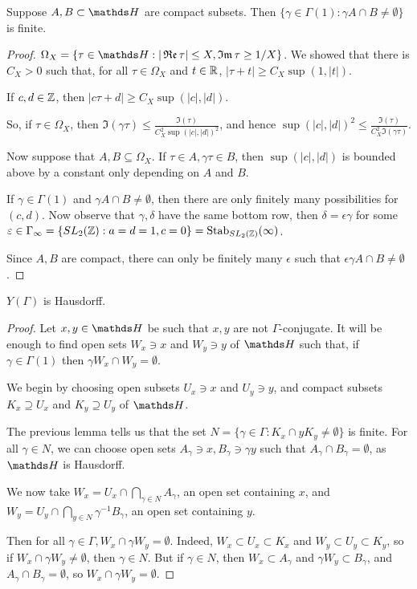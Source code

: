 \documentclass[10pt,a4paper]{article}
\begin{document}
\begin{lemma}
  Suppose $A, B \subset \H$ are compact subsets. Then $\{\gamma \in \Gamma(1): \gamma A \cap B \neq \emptyset\}$ is finite.
\end{lemma}
\begin{proof}
  $\Omega_X = \{\tau \in \H: |\Re \tau| \leq X, \Im \tau \geq 1/X\}$. We showed that there is $C_X >0$ such that, for all $\tau \in \Omega_X$ and $t \in \mathbb{R}$, $|\tau+t| \geq C_X\sup(1, |t|)$.

  If $c,d \in \mathbb{Z}$, then $|c\tau +d| \geq C_X \sup(|c|, |d|)$.

  So, if $\tau \in \Omega_X$, then $\Im(\gamma \tau) \leq \frac{\Im(\tau)}{C_X^2 \sup(|c|,|d|)^2}$, and hence $\sup(|c|,|d|)^2 \leq \frac{\Im(\tau)}{C_X^2 \Im(\gamma \tau)}$.

  Now suppose that $A, B \subseteq \Omega_X$. If $\tau \in A, \gamma \tau \in B$, then $\sup(|c|, |d|)$ is bounded above by a constant only depending on $A$ and $B$.

  If $\gamma \in \Gamma(1)$ and $\gamma A \cap B \neq \emptyset$, then there are only finitely many possibilities for $(c,d)$. Now observe that $\gamma, \delta$ have the same bottom row, then $\delta = \epsilon \gamma$ for some $\varepsilon \in \Gamma_\infty = \{SL_2(\mathbb{Z}): a=d=1, c=0\} = \operatorname{Stab}_{SL_2(\mathbb{Z})}(\infty)$.

  Since $A,B$ are compact, there can only be finitely many $\epsilon$ such that $\epsilon \gamma A \cap B \neq \emptyset$.
\end{proof}
\begin{proposition}
  $Y(\Gamma)$ is Hausdorff.
\end{proposition}
\begin{proof}
  Let $x, y \in \H$ be such that $x, y$ are not $\Gamma$-conjugate. It will be enough to find open sets $W_x \ni x$ and $W_y \ni y$ of $\H$ such that, if $\gamma \in \Gamma(1)$ then $\gamma W_x \cap W_y = \emptyset$.

  We begin by choosing open subsets $U_x \ni x$ and $U_y \ni y$, and compact subsets $K_x \supseteq U_x$ and $K_y \supseteq U_y$ of $\H$.

  The previous lemma tells us that the set $N = \{\gamma \in \Gamma: K_x \cap yK_y \neq \emptyset\}$ is finite. For all $\gamma \in N$, we can choose open sets $A_\gamma \ni x, B_\gamma \ni \gamma y$ such that $A_\gamma \cap B_\gamma = \emptyset$, as $\H$ is Hausdorff.

  We now take $W_x = U_x \cap \bigcap_{\gamma \in N} A_\gamma$, an open set containing $x$, and $W_y = U_y \cap \bigcap_{y \in N}\gamma^{-1}B_\gamma$, an open set containing $y$.

  Then for all $\gamma \in \Gamma, W_x \cap \gamma W_y = \emptyset$. Indeed, $W_x \subset U_x \subset K_x$ and $W_y \subset U_y \subset K_y$, so if $W_x \cap \gamma W_y \neq \emptyset$, then $\gamma \in N$. But if $\gamma \in N$, then $W_x \subset A_\gamma$ and $\gamma W_y \subset B_\gamma$, and $A_\gamma \cap B_\gamma = \emptyset$, so $W_x \cap \gamma W_y = \emptyset$.
\end{proof}
\end{document}
